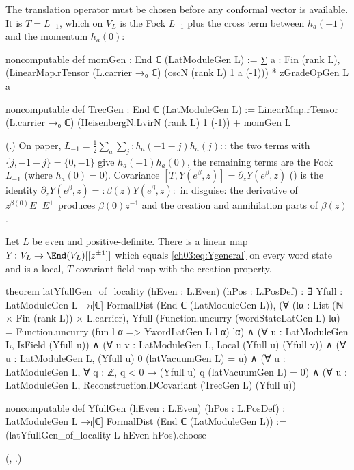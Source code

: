 The translation operator must be chosen before any conformal vector is available. It is
$T=L_{-1}$, which on $V_L$ is the Fock $L_{-1}$ plus the cross term between $h_a(-1)$ and the
momentum $h_a(0)$:
\begin{leancode}
noncomputable def momGen : End ℂ (LatModuleGen L) :=
  ∑ a : Fin (rank L), (LinearMap.rTensor (L.carrier →₀ ℂ) (oscN (rank L) 1 a (-1))) * zGradeOpGen L a

noncomputable def TrecGen : End ℂ (LatModuleGen L) :=
  LinearMap.rTensor (L.carrier →₀ ℂ) (HeisenbergN.LvirN (rank L) 1 (-1)) + momGen L
\end{leancode}
(.) On paper,
$L_{-1}=\frac12\sum_a\sum_j{:}h_a(-1-j)h_a(j){:}$; the two terms with $\{j,-1-j\}=\{0,-1\}$ give
$h_a(-1)h_a(0)$, the remaining terms are the Fock $L_{-1}$ (where $h_a(0)=0$). Covariance
$[T,Y(e^\beta,z)]=\partial_zY(e^\beta,z)$ () is the identity
$\partial_zY(e^\beta,z)={:}\beta(z)Y(e^\beta,z){:}$ in disguise: the derivative of
$z^{\beta(0)}E^-E^+$ produces $\beta(0)z^{-1}$ and the creation and annihilation parts of
$\beta(z)$.

\begin{theorem}\label{ch03:thm:latYfull}
Let $L$ be even and positive-definite. There is a linear map $Y\colon V_L\to\End(V_L)[[z^{\pm1}]]$
which equals \eqref{ch03:eq:Ygeneral} on every word state and is a local, $T$-covariant field map
with the creation property.
\end{theorem}
\begin{leancode}
theorem latYfullGen_of_locality (hEven : L.Even) (hPos : L.PosDef) :
    ∃ Yfull : LatModuleGen L →ₗ[ℂ] FormalDist (End ℂ (LatModuleGen L)),
      (∀ (lα : List (ℕ × Fin (rank L)) × L.carrier),
        Yfull (Function.uncurry (wordStateLatGen L) lα)
          = Function.uncurry (fun l α => YwordLatGen L l α) lα) ∧
      (∀ u : LatModuleGen L, IsField (Yfull u)) ∧
      (∀ u v : LatModuleGen L, Local (Yfull u) (Yfull v)) ∧
      (∀ u : LatModuleGen L, (Yfull u) 0 (latVacuumGen L) = u) ∧
      (∀ u : LatModuleGen L, ∀ q : ℤ, q < 0 → (Yfull u) q (latVacuumGen L) = 0) ∧
      (∀ u : LatModuleGen L, Reconstruction.DCovariant (TrecGen L) (Yfull u))

noncomputable def YfullGen (hEven : L.Even) (hPos : L.PosDef) :
    LatModuleGen L →ₗ[ℂ] FormalDist (End ℂ (LatModuleGen L)) :=
  (latYfullGen_of_locality L hEven hPos).choose
\end{leancode}
(, .)

